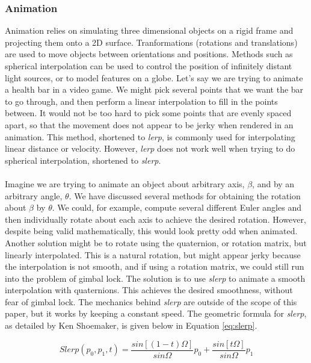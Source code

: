 \subsubsection{Animation}
Animation relies on simulating three dimensional objects on a rigid frame and projecting them onto a 2D surface.
Tranformations (rotations and translations) are used to move objects between orientations and positions.
Methods such as spherical interpolation can be used to control the position of infinitely distant light sources, or to model features on a globe.
Let's say we are trying to animate a health bar in a video game.
We might pick several points that we want the bar to go through, and then perform a linear interpolation to fill in the points between.
It would not be too hard to pick some points that are evenly spaced apart, so that the movement does not appear to be jerky when rendered in an animation.
This method, shortened to \textit{lerp}, is commonly used for interpolating linear distance or velocity.
However, \textit{lerp} does not work well when trying to do spherical interpolation, shortened to \textit{slerp}. \cite{animation}
\\ \\ Imagine we are trying to animate an object about arbitrary axis, $\beta$, and by an arbitrary angle, $\theta$.
We have discussed several methods for obtaining the rotation about $\beta$ by $\theta$.
We could, for example, compute several different Euler angles and then individually rotate about each axis to achieve the desired rotation.
However, despite being valid mathematically, this would look pretty odd when animated.
Another solution might be to rotate using the quaternion, or rotation matrix, but linearly interpolated.
This is a natural rotation, but might appear jerky because the interpolation is not smooth, and if using a rotation matrix, we could still run into the problem of gimbal lock.
The solution is to use \textit{slerp} to animate a smooth interpolation with quaternions.
This achieves the desired smoothness, without fear of gimbal lock.
The mechanics behind \textit{slerp} are outside of the scope of this paper, but it works by keeping a constant speed.
The geometric formula for \textit{slerp}, as detailed by Ken Shoemaker, is given below in Equation \ref{eq:slerp}.

\begin{equation}
	Slerp(p_0, p_1, t) = \frac{sin[(1-t)\Omega]}{sin\Omega}p_0 + \frac{sin[t\Omega]}{sin\Omega}p_1
	\label{eq:slerp}
\end{equation}

